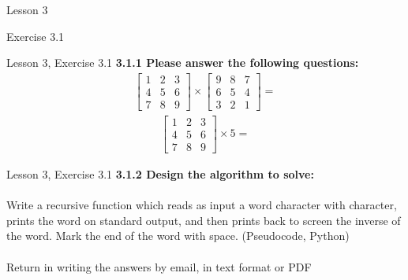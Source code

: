 \documentclass[aspectratio=1610]{beamer}
\begin{document}
\begin{frame}{Lesson 3}{}
\begin{center}
\Huge Exercise 3.1
\end{center}
\end{frame}

\begin{frame}{Lesson 3, Exercise 3.1}{}
\Large
\textbf{3.1.1 Please answer the following questions:}\\
\begin{align}
   \begin{bmatrix}
        1 & 2 & 3\\
        4 & 5 & 6\\
        7 & 8 & 9
     \end{bmatrix}
     \times
     \begin{bmatrix}
       9 & 8 & 7\\
       6 & 5 & 4\\
       3 & 2 & 1
     \end{bmatrix} =
\end{align}   
\begin{align}
   \begin{bmatrix}
        1 & 2 & 3\\
        4 & 5 & 6\\
        7 & 8 & 9
     \end{bmatrix}
     \times
     5 =
\end{align}

\end{frame}


\begin{frame}{Lesson 3, Exercise 3.1}{}
\Large
\textbf{3.1.2 Design the algorithm to solve:}\\~\\
Write a recursive function which reads as input a word character with
character, prints the word on standard output, and then prints back to screen the inverse of the word. Mark the end of the word with space. (Pseudocode, Python) 
\\~\\
Return in writing the answers by email, in text format or PDF
\end{frame}
\end{document}
